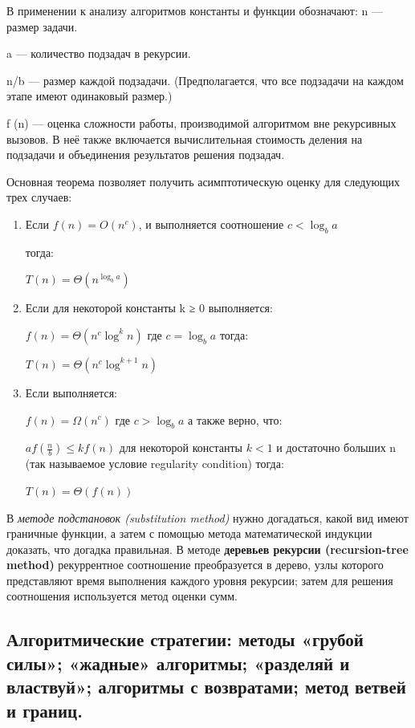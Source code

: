 \documentclass[12pt, a4paper]{article}
\begin{document}
В применении к анализу алгоритмов константы и функции обозначают:
n — размер задачи.

a — количество подзадач в рекурсии.

n/b — размер каждой подзадачи. (Предполагается, что все подзадачи на каждом этапе имеют одинаковый размер.)

f (n) — оценка сложности работы, производимой алгоритмом вне рекурсивных вызовов. В неё также включается вычислительная стоимость деления на подзадачи и объединения результатов решения подзадач.

Основная теорема позволяет получить асимптотическую оценку для следующих трех случаев:

\begin{enumerate}
    \item Если $f(n)=O\left(n^{{c}}\right)$, и выполняется соотношение $c<\log _{b}a$

тогда:

$T(n)=\Theta \left(n^{{\log _{b}a}}\right)$

    \item Если для некоторой константы k ≥ 0 выполняется:

$f(n)=\Theta \left(n^{{c}}\log ^{{k}}n\right)$ где $c=\log _{b}a$
тогда:

$T(n)=\Theta \left(n^{{c}}\log ^{{k+1}}n\right)$

    \item Если выполняется:

$f(n)=\Omega \left(n^{{c}}\right)$ где $c>\log _{b}a$
а также верно, что:

$af\left({\frac  {n}{b}}\right)\leq kf(n)$ для некоторой константы $k<1$ и достаточно больших n (так называемое условие regularity condition)
тогда:

$ T\left(n\right)=\Theta \left(f(n)\right)$

\end{enumerate}

В \textit{методе подстановок (substitution method)} нужно догадаться, какой вид имеют
граничные функции, а затем с помощью метода математической индукции доказать, что догадка правильная. В методе \textbf{деревьев рекурсии (recursion-tree method)}
рекуррентное соотношение преобразуется в дерево, узлы которого представляют
время выполнения каждого уровня рекурсии; затем для решения соотношения
используется метод оценки сумм.

\subsection{Алгоритмические стратегии: методы «грубой силы»; «жадные» алгоритмы; «разделяй и властвуй»; алгоритмы с возвратами; метод ветвей и границ.}
\end{document}
